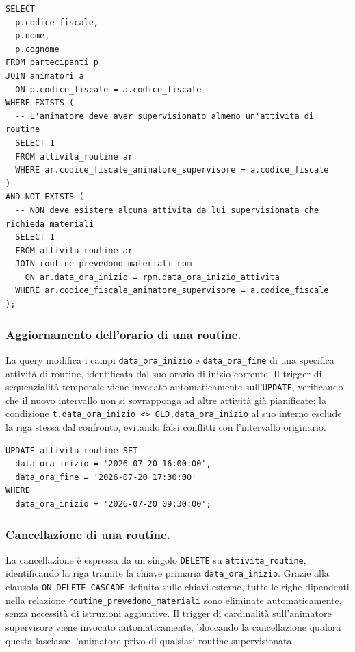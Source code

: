 \documentclass[11pt,a4paper]{article}
\begin{document}
\begin{verbatim}
SELECT
  p.codice_fiscale,
  p.nome,
  p.cognome
FROM partecipanti p
JOIN animatori a
  ON p.codice_fiscale = a.codice_fiscale
WHERE EXISTS (
  -- L'animatore deve aver supervisionato almeno un'attivita di routine
  SELECT 1
  FROM attivita_routine ar
  WHERE ar.codice_fiscale_animatore_supervisore = a.codice_fiscale
)
AND NOT EXISTS (
  -- NON deve esistere alcuna attivita da lui supervisionata che richieda materiali
  SELECT 1
  FROM attivita_routine ar
  JOIN routine_prevedono_materiali rpm
    ON ar.data_ora_inizio = rpm.data_ora_inizio_attivita
  WHERE ar.codice_fiscale_animatore_supervisore = a.codice_fiscale
);
\end{verbatim}

\subsubsection{Aggiornamento dell'orario di una routine.}
La query modifica i campi \texttt{data\_ora\_inizio} e \texttt{data\_ora\_fine} di una specifica
attività di routine, identificata dal suo orario di inizio corrente. Il trigger di
sequenzialità temporale viene invocato automaticamente sull'\texttt{UPDATE}, verificando che il
nuovo intervallo non si sovrapponga ad altre attività già pianificate; la condizione
\texttt{t.data\_ora\_inizio <> OLD.data\_ora\_inizio} al suo interno esclude la riga stessa dal
confronto, evitando falsi conflitti con l'intervallo originario.

\begin{verbatim}
UPDATE attivita_routine SET
  data_ora_inizio = '2026-07-20 16:00:00',
  data_ora_fine = '2026-07-20 17:30:00'
WHERE
  data_ora_inizio = '2026-07-20 09:30:00';
\end{verbatim}

\subsubsection{Cancellazione di una routine.}
La cancellazione è espressa da un singolo \texttt{DELETE} su \texttt{attivita\_routine},
identificando la riga tramite la chiave primaria \texttt{data\_ora\_inizio}. Grazie alla
clausola \texttt{ON DELETE CASCADE} definita sulle chiavi esterne, tutte le righe dipendenti
nella relazione \texttt{routine\_prevedono\_materiali} sono eliminate automaticamente, senza
necessità di istruzioni aggiuntive. Il trigger di cardinalità sull'animatore supervisore viene
invocato automaticamente, bloccando la cancellazione qualora questa lasciasse l'animatore privo
di qualsiasi routine supervisionata.
\end{document}
